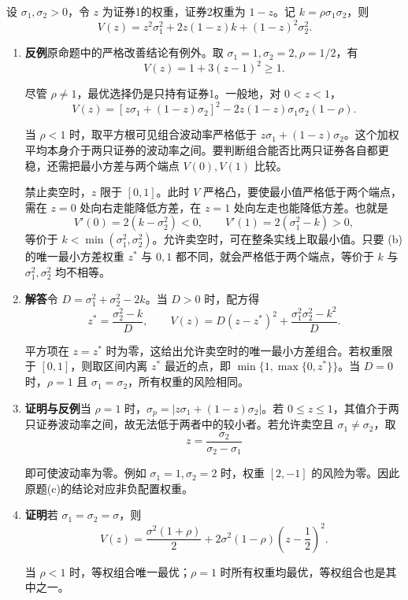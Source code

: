 \begin{solution}
设 $\sigma_1,\sigma_2>0$，令 $z$ 为证券1的权重，证券2权重为 $1-z$。记 $k=\rho\sigma_1\sigma_2$，则
\[
 V(z)=z^2\sigma_1^2+2z(1-z)k+(1-z)^2\sigma_2^2.
\]
\begin{enumerate}[label=(\alph*)]
\item \textbf{反例}\quad 原命题中的严格改善结论有例外。取 $\sigma_1=1,\sigma_2=2,\rho=1/2$，有
\[
 V(z)=1+3(z-1)^2\ge1.
\]

尽管 $\rho\ne1$，最优选择仍是只持有证券1。一般地，对 $0<z<1$，
\[
 V(z)=[z\sigma_1+(1-z)\sigma_2]^2
 -2z(1-z)\sigma_1\sigma_2(1-\rho).
\]

当 $\rho<1$ 时，取平方根可见组合波动率严格低于 $z\sigma_1+(1-z)\sigma_2$。这个加权平均本身介于两只证券的波动率之间。要判断组合能否比两只证券各自都更稳，还需把最小方差与两个端点 $V(0),V(1)$ 比较。

禁止卖空时，$z$ 限于 $[0,1]$。此时 $V$ 严格凸，要使最小值严格低于两个端点，需在 $z=0$ 处向右走能降低方差，在 $z=1$ 处向左走也能降低方差。也就是
\[
 V'(0)=2(k-\sigma_2^2)<0,\qquad V'(1)=2(\sigma_1^2-k)>0,
\]
等价于 $k<\min(\sigma_1^2,\sigma_2^2)$。允许卖空时，可在整条实线上取最小值。只要 (b) 的唯一最小方差权重 $z^*$ 与 $0,1$ 都不同，就会严格低于两个端点，等价于 $k$ 与 $\sigma_1^2,\sigma_2^2$ 均不相等。

\item \textbf{解答}\quad 令 $D=\sigma_1^2+\sigma_2^2-2k$。当 $D>0$ 时，配方得
\[
 z^*=\frac{\sigma_2^2-k}{D},\qquad
 V(z)=D(z-z^*)^2+\frac{\sigma_1^2\sigma_2^2-k^2}{D}.
\]

平方项在 $z=z^*$ 时为零，这给出允许卖空时的唯一最小方差组合。若权重限于 $[0,1]$，则取区间内离 $z^*$ 最近的点，即 $\min\{1,\max\{0,z^*\}\}$。当 $D=0$ 时，$\rho=1$ 且 $\sigma_1=\sigma_2$，所有权重的风险相同。

\item \textbf{证明与反例}\quad 当 $\rho=1$ 时，$\sigma_p=|z\sigma_1+(1-z)\sigma_2|$。若 $0\le z\le1$，其值介于两只证券波动率之间，故无法低于两者中的较小者。若允许卖空且 $\sigma_1\ne\sigma_2$，取
\[
 z=\frac{\sigma_2}{\sigma_2-\sigma_1}
\]

即可使波动率为零。例如 $\sigma_1=1,\sigma_2=2$ 时，权重 $[2,-1]$ 的风险为零。因此原题(c)的结论对应非负配置权重。

\item \textbf{证明}\quad 若 $\sigma_1=\sigma_2=\sigma$，则
\[
 V(z)=\frac{\sigma^2(1+\rho)}2
 +2\sigma^2(1-\rho)\left(z-\frac12\right)^2.
\]

当 $\rho<1$ 时，等权组合唯一最优；$\rho=1$ 时所有权重均最优，等权组合也是其中之一。\qedhere
\end{enumerate}
\end{solution}

